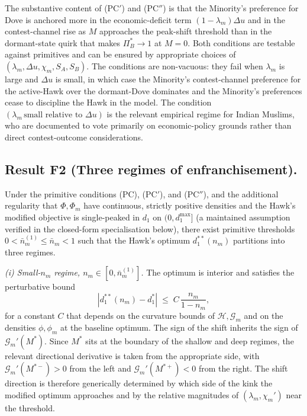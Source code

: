 \documentclass[11pt,twoside]{extarticle}
\begin{document}
The substantive content of (PC$'$) and (PC$''$) is that the Minority's preference for Dove is anchored more in the economic-deficit term $(1-\lambda_m)\Delta u$ and in the contest-channel rise as $M$ approaches the peak-shift threshold than in the dormant-state quirk that makes $\Pi_B^{*}\to 1$ at $M=0$. Both conditions are testable against primitives and can be ensured by appropriate choices of $(\lambda_m,\Delta u,\chi_m,S_A,S_B)$. The conditions are non-vacuous: they fail when $\lambda_m$ is large and $\Delta u$ is small, in which case the Minority's contest-channel preference for the active-Hawk over the dormant-Dove dominates and the Minority's preferences cease to discipline the Hawk in the model. The condition $(\lambda_m\,\text{small relative to }\Delta u)$ is the relevant empirical regime for Indian Muslims, who are documented to vote primarily on economic-policy grounds rather than direct contest-outcome considerations.

\subsection*{Result F2 (Three regimes of enfranchisement).} Under the primitive conditions (PC), (PC$'$), and (PC$''$), and the additional regularity that $\Phi,\Phi_m$ have continuous, strictly positive densities and the Hawk's modified objective is single-peaked in $d_1$ on $(0,d_1^{\max}]$ (a maintained assumption verified in the closed-form specialisation below), there exist primitive thresholds $0<\bar n_m^{(1)}\le\bar n_m<1$ such that the Hawk's optimum $d_1^{**}(n_m)$ partitions into three regimes.

\medskip\noindent\textit{(i) Small-$n_m$ regime, $n_m\in[0,\bar n_m^{(1)}]$.} The optimum is interior and satisfies the perturbative bound
\begin{equation}\label{eq:perturb_bound_oaF}
    |d_1^{**}(n_m)-d_1^{*}|\;\le\;C\,\frac{n_m}{1-n_m},
\end{equation}
for a constant $C$ that depends on the curvature bounds of $\mathcal H,\mathcal G_m$ and on the densities $\phi,\phi_m$ at the baseline optimum. The sign of the shift inherits the sign of $\mathcal G_m'(M^{*})$. Since $M^{*}$ sits at the boundary of the shallow and deep regimes, the relevant directional derivative is taken from the appropriate side, with $\mathcal G_m'(M^{*-})>0$ from the left and $\mathcal G_m'(M^{*+})<0$ from the right. The shift direction is therefore generically determined by which side of the kink the modified optimum approaches and by the relative magnitudes of $(\lambda_m,\chi_m')$ near the threshold.
\end{document}
